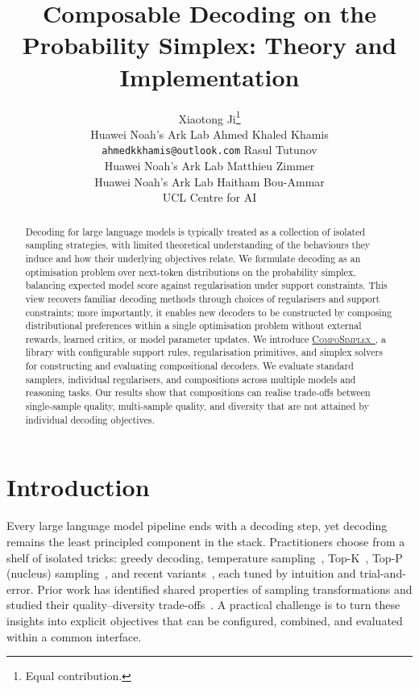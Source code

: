 \documentclass{article} %
\title{Composable Decoding on the Probability Simplex: Theory and Implementation}
\author{Xiaotong Ji\thanks{Equal contribution.} \\
\textnormal{Huawei Noah’s Ark Lab}
\And
Ahmed Khaled Khamis\footnotemark[1] \\
\textnormal{\texttt{ahmedkkhamis@outlook.com}}
\And 
Rasul Tutunov \\
\textnormal{Huawei Noah’s Ark Lab}
\And
Matthieu Zimmer \\
\textnormal{Huawei Noah’s Ark Lab}
\And
Haitham Bou-Ammar \\
\textnormal{UCL Centre for AI}
}
\begin{document}
\maketitle


\begin{abstract}
Decoding for large language models is typically treated as a collection of isolated sampling strategies, with limited theoretical understanding of the behaviours they induce and how their underlying objectives relate.
We formulate decoding as an optimisation problem over next-token distributions on the probability simplex, balancing expected model score against regularisation under support constraints.
This view recovers familiar decoding methods through choices of regularisers and support constraints; more importantly, it enables new decoders to be constructed by composing distributional preferences within a single optimisation problem without external rewards, learned critics, or model parameter updates.
We introduce \href{https://github.com/KickItLikeShika/composimplex}{\textsc{CompoSimplex}~\faGithub}, a library with configurable support rules, regularisation primitives, and simplex solvers for constructing and evaluating compositional decoders.
We evaluate standard samplers, individual regularisers, and compositions across multiple models and reasoning tasks.
Our results show that compositions can realise trade-offs between single-sample quality, multi-sample quality, and diversity that are not attained by individual decoding objectives.
\end{abstract}

\section{Introduction}
Every large language model pipeline ends with a decoding step, yet decoding remains the least principled component in the stack. 
Practitioners choose from a shelf of isolated tricks: greedy decoding, temperature sampling~\citep{nadeem2020systematic}, Top-K~\citep{fan2018hierarchicalneuralstorygeneration}, Top-P (nucleus) sampling~\citep{holtzman2019curious}, and recent variants~\citep{meister2023locally,hewitt2022truncation,nguyen2025turning}, each tuned by intuition and trial-and-error.
Prior work has identified shared properties of sampling transformations and studied their quality--diversity trade-offs~\citep{nadeem2020systematic,wiher2022decoding}.
A practical challenge is to turn these insights into explicit objectives that can be configured, combined, and evaluated within a common interface.
\end{document}
